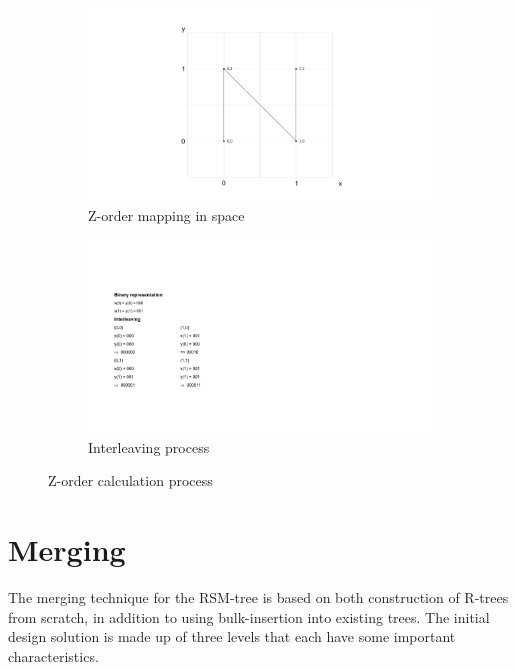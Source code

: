 \begin{figure}[ht]
     \centering
     \begin{subfigure}{0.45\textwidth}
         \centering
         \includegraphics[width=\textwidth]{figures/zorder_process_graph.pdf}
         \caption{Z-order mapping in space}
         \label{fig:zspace}
     \end{subfigure}
     \hfill
      \begin{subfigure}{0.45\textwidth}
     \centering
     \includegraphics[width=\textwidth]{figures/zorder_process_interleaving.pdf}
     \caption{Interleaving process}
     \label{fig:zinterleave}
     \end{subfigure}
    \hfill
    \caption{Z-order calculation process}
    \label{fig:bitInterleaving}
\end{figure}

\section{Merging}
\label{sect:RSM-Merging}
The merging technique for the RSM-tree is based on both construction of R-trees from scratch, in addition to using bulk-insertion into existing trees. The initial design solution is made up of three levels that each have some important characteristics. 

